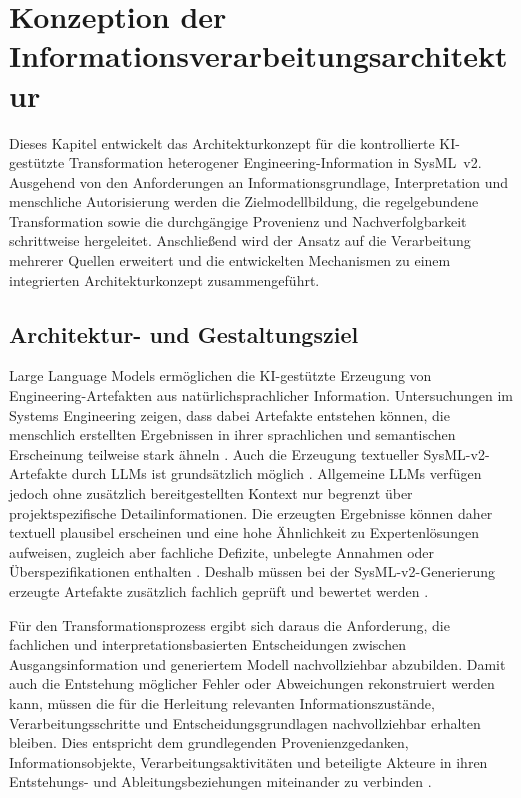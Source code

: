 \section{Konzeption der Informationsverarbeitungsarchitektur}
\label{sec:architecture}

Dieses Kapitel entwickelt das Architekturkonzept für die kontrollierte
KI-gestützte Transformation heterogener Engineering-Information in
SysML~v2. Ausgehend von den Anforderungen an Informationsgrundlage,
Interpretation und menschliche Autorisierung werden die Zielmodellbildung,
die regelgebundene Transformation sowie die durchgängige Provenienz und
Nachverfolgbarkeit schrittweise hergeleitet. Anschließend wird der Ansatz auf
die Verarbeitung mehrerer Quellen erweitert und die entwickelten Mechanismen
zu einem integrierten Architekturkonzept zusammengeführt.

\subsection{Architektur- und Gestaltungsziel}
\label{sec:architecture_problem}

Large Language Models ermöglichen die KI-gestützte Erzeugung von
Engineering-Artefakten aus natürlichsprachlicher Information. Untersuchungen
im Systems Engineering zeigen, dass dabei Artefakte entstehen können, die
menschlich erstellten Ergebnissen in ihrer sprachlichen und semantischen
Erscheinung teilweise stark ähneln \cite{Topcu2025}. Auch die Erzeugung
textueller SysML-v2-Artefakte durch LLMs ist grundsätzlich möglich
\cite{Stein2026}. Allgemeine LLMs verfügen jedoch ohne zusätzlich
bereitgestellten Kontext nur begrenzt über projektspezifische
Detailinformationen. Die erzeugten Ergebnisse können daher textuell plausibel
erscheinen und eine hohe Ähnlichkeit zu Expertenlösungen aufweisen, zugleich
aber fachliche Defizite, unbelegte Annahmen oder Überspezifikationen enthalten
\cite{Topcu2025}. Deshalb müssen bei der SysML-v2-Generierung erzeugte
Artefakte zusätzlich fachlich geprüft und bewertet werden
\cite{Stein2026}.

Für den Transformationsprozess ergibt sich daraus die Anforderung, die
fachlichen und interpretationsbasierten Entscheidungen zwischen
Ausgangsinformation und generiertem Modell nachvollziehbar abzubilden. Damit
auch die Entstehung möglicher Fehler oder Abweichungen rekonstruiert werden
kann, müssen die für die Herleitung relevanten Informationszustände,
Verarbeitungsschritte und Entscheidungsgrundlagen nachvollziehbar erhalten
bleiben. Dies entspricht dem grundlegenden Provenienzgedanken,
Informationsobjekte, Verarbeitungsaktivitäten und beteiligte Akteure in ihren
Entstehungs- und Ableitungsbeziehungen miteinander zu verbinden
\cite{MoreauMissier2013}.

